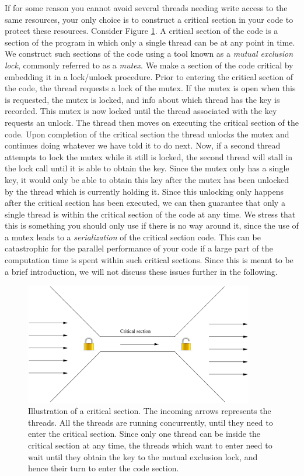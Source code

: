 \documentclass[twoside, 11pt, a4paper]{article}
\begin{document}
If for some reason you cannot avoid several threads needing write access to the same resources,
your only choice is to construct a critical section in your code to protect these resources.
Consider Figure \ref{fig:cs}. A critical section of the code is a section of the program in 
which only a single thread can be at any point in time. We construct such sections of the code using
a tool known as a \emph{mutual exclusion lock}, commonly referred to as a \emph{mutex}.
We make a section of the code critical by embedding it in a lock/unlock procedure.
Prior to entering the critical section of the code, the thread requests a lock of the mutex.
If the mutex is open when this is requested, the mutex is locked, and info about which thread
has the key is recorded. This mutex is now locked until the thread associated with the key
requests an unlock. The thread then moves on executing the critical section of the code.
Upon completion of the critical section the thread unlocks the mutex and continues doing 
whatever we have told it to do next.
Now, if a second thread attempts to lock the mutex while it still is locked,
the second thread will stall in the lock call until it is able to obtain the key.
Since the mutex only has a single key, it would only be able to obtain this key
after the mutex has been unlocked by the thread which is currently holding it.
Since this unlocking only happens after the critical section has been executed, we can
then guarantee that only a single thread is within the critical section of the code at any
time. We stress that this is something you should only use if there is no way around it,
since the use of a mutex leads to a \emph{serialization} of the critical section code.
This can be catastrophic for the parallel performance of your code if a large part of the
computation time is spent within such critical sections. Since this is meant to be
a brief introduction, we will not discuss these issues further in the following. 

\begin{figure}[ht]
	\begin{center}
		\includegraphics[width=10cm]{CriticalSection}
	\end{center}
	\caption{Illustration of a critical section. The incoming arrows represents the threads.
			 All the threads are running concurrently, until they need to enter the critical section.
			 Since only one thread can be inside the critical section 
			 at any time, the threads which want to enter need to wait until they obtain
			 the key to the mutual exclusion lock, and hence their turn to enter the code section.}
	\label{fig:cs}
\end{figure}
\end{document}
